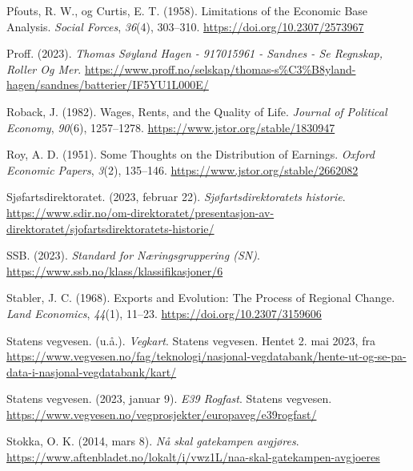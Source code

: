 \documentclass[
]{article}
\newlength{\cslhangindent}
\newlength{\cslentryspacingunit} %
\newenvironment{CSLReferences}[2] %
 {%
  \setlength{\parindent}{0pt}
  \ifodd #1
  \let\oldpar\par
  \def\par{\hangindent=\cslhangindent\oldpar}
  \fi
  \setlength{\parskip}{#2\cslentryspacingunit}
 }%
 {}
\begin{document}
\begin{CSLReferences}{1}{0}
\leavevmode{}%
Pfouts, R. W., og Curtis, E. T. (1958). Limitations of the {Economic
Base Analysis}. \emph{Social Forces}, \emph{36}(4), 303--310.
\url{https://doi.org/10.2307/2573967}

\leavevmode{}%
Proff. (2023). \emph{Thomas {Søyland Hagen} - 917015961 - {Sandnes} -
{Se Regnskap}, {Roller} Og Mer}.
\url{https://www.proff.no/selskap/thomas-s\%C3\%B8yland-hagen/sandnes/batterier/IF5YU1L000E/}

\leavevmode{}%
Roback, J. (1982). Wages, {Rents}, and the {Quality} of {Life}.
\emph{Journal of Political Economy}, \emph{90}(6), 1257--1278.
\url{https://www.jstor.org/stable/1830947}

\leavevmode{}%
Roy, A. D. (1951). Some {Thoughts} on the {Distribution} of {Earnings}.
\emph{Oxford Economic Papers}, \emph{3}(2), 135--146.
\url{https://www.jstor.org/stable/2662082}

\leavevmode{}%
Sjøfartsdirektoratet. (2023, februar 22). \emph{Sjøfartsdirektoratets
historie}.
\url{https://www.sdir.no/om-direktoratet/presentasjon-av-direktoratet/sjofartsdirektoratets-historie/}

\leavevmode{}%
SSB. (2023). \emph{Standard for Næringsgruppering ({SN})}.
\url{https://www.ssb.no/klass/klassifikasjoner/6}

\leavevmode{}%
Stabler, J. C. (1968). Exports and {Evolution}: {The Process} of
{Regional Change}. \emph{Land Economics}, \emph{44}(1), 11--23.
\url{https://doi.org/10.2307/3159606}

\leavevmode{}%
Statens vegvesen. (u.å.). \emph{Vegkart}. {Statens vegvesen}. Hentet 2.
mai 2023, fra
\url{https://www.vegvesen.no/fag/teknologi/nasjonal-vegdatabank/hente-ut-og-se-pa-data-i-nasjonal-vegdatabank/kart/}

\leavevmode{}%
Statens vegvesen. (2023, januar 9). \emph{E39 Rogfast}. {Statens
vegvesen}.
\url{https://www.vegvesen.no/vegprosjekter/europaveg/e39rogfast/}

\leavevmode{}%
Stokka, O. K. (2014, mars 8). \emph{Nå skal gatekampen avgjøres}.
\url{https://www.aftenbladet.no/lokalt/i/vwz1L/naa-skal-gatekampen-avgjoeres}


\end{CSLReferences}
\end{document}
